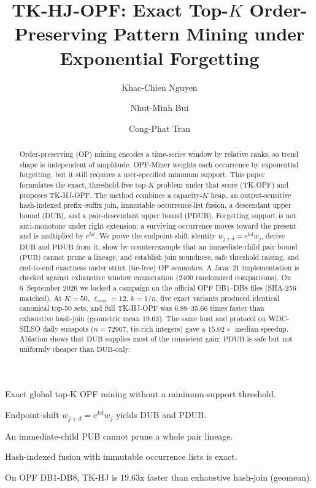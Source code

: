 \documentclass[preprint,12pt]{elsarticle}
\newcommand{\DUB}{\mathrm{DUB}}
\newcommand{\PDUB}{\mathrm{PDUB}}
\newcommand{\PUB}{\mathrm{PUB}}
\theoremstyle{plain}
\theoremstyle{definition}
\theoremstyle{remark}
\begin{document}
\hypersetup{pageanchor=false}
\begin{frontmatter}

\title{TK-HJ-OPF: Exact Top-\texorpdfstring{$K$}{K} Order-Preserving Pattern Mining under Exponential Forgetting}

\author[ppu]{Khac-Chien Nguyen}
\author[ppu]{Nhut-Minh Bui}
\author[ppu]{Cong-Phat Tran}

\begin{abstract}
Order-preserving (OP) mining encodes a time-series window by relative ranks, so trend shape is independent of amplitude. OPF-Miner weights each occurrence by exponential forgetting, but it still requires a user-specified minimum support. This paper formulates the exact, threshold-free top-$K$ problem under that score (TK-OPF) and proposes TK-HJ-OPF. The method combines a capacity-$K$ heap, an output-sensitive hash-indexed prefix--suffix join, immutable occurrence-list fusion, a descendant upper bound ($\DUB$), and a pair-descendant upper bound ($\PDUB$). Forgetting support is not anti-monotone under right extension: a surviving occurrence moves toward the present and is multiplied by $e^{kd}$. We prove the endpoint-shift identity $w_{j+d}=e^{kd}w_j$, derive $\DUB$ and $\PDUB$ from it, show by counterexample that an immediate-child pair bound ($\PUB$) cannot prune a lineage, and establish join soundness, safe threshold raising, and end-to-end exactness under strict (tie-free) OP semantics. A Java~21 implementation is checked against exhaustive window enumeration ($2400$ randomized comparisons). On 6~September 2026 we locked a campaign on the official OPF DB1--DB8 files (SHA-256 matched). At $K=50$, $\ell_{\max}=12$, $k=1/n$, five exact variants produced identical canonical top-50 sets, and full TK-HJ-OPF was $6.88$--$35.66$ times faster than exhaustive hash-join (geometric mean $19.63$). The same host and protocol on WDC-SILSO daily sunspots ($n=72967$, tie-rich integers) gave a $15.02\times$ median speedup. Ablation shows that $\DUB$ supplies most of the consistent gain; $\PDUB$ is safe but not uniformly cheaper than $\DUB$-only.
\end{abstract}

\begin{highlights}
\item Exact global top-K OPF mining without a minimum-support threshold.
\item Endpoint-shift $w_{j+d}=e^{kd}w_j$ yields DUB and PDUB.
\item An immediate-child PUB cannot prune a whole pair lineage.
\item Hash-indexed fusion with immutable occurrence lists is exact.
\item On OPF DB1-DB8, TK-HJ is 19.63x faster than exhaustive hash-join (geomean).
\end{highlights}


\end{frontmatter}
\end{document}
